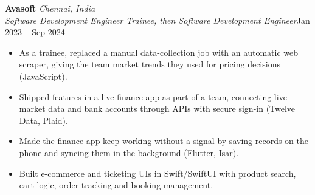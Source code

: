 \documentclass[a4paper,11pt]{article}
\newcommand{\role}[4]{%
  \textbf{#1}{\color{muted}\,\textperiodcentered\,\textit{#2}}\\
  \textit{#4}\hfill{\color{muted}#3}\par}
\newcommand{\gap}{\vspace{5pt}}
\begin{document}
\gap
{}
\role{Avasoft}{Chennai, India}{Jan 2023 – Sep 2024}{Software Development Engineer Trainee, then Software Development Engineer}
\begin{itemize}
  \item As a trainee, replaced a manual data-collection job with an automatic web scraper, giving the team market trends they used for pricing decisions (JavaScript).
  \item Shipped features in a live finance app as part of a team, connecting live market data and bank accounts through APIs with secure sign-in (Twelve Data, Plaid).
  \item Made the finance app keep working without a signal by saving records on the phone and syncing them in the background (Flutter, Isar).
  \item Built e-commerce and ticketing UIs in Swift/SwiftUI with product search, cart logic, order tracking and booking management.
\end{itemize}
\end{document}
